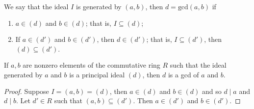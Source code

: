 \begin{definition}
    We say that the ideal \( I \) is generated by \( (a,b) \), then \( d= \text{gcd} (a,b)    \) if      
    \begin{enumerate}
        \item[(i)]  \( a \in (d) \) and \( b \in (d) \); that is, \( I \subseteq (d) \);
        \item[(ii)] If \( a \in (d') \) and \( b \in (d') \), then \( d \in (d') \); that is, \( I \subseteq (d') \), then \( (d) \subseteq (d') \).        
    \end{enumerate}
\end{definition}

\begin{prop}
    If \( a,b  \) are nonzero elements of the commutative ring \( R  \) such that the ideal generated by \( a \) and \( b  \) is a principal ideal \( (d) \), then \( d \) is a gcd of \( a \) and \( b  \).  
\end{prop}

\begin{proof}
Suppose \( I = (a,b) = (d) \), then \( a \in (d) \) and \( b \in (d) \) and so \( d \mid a  \) and \( d \mid b  \). Let \( d' \in R  \) such that \( (a,b) \subseteq (d')\). Then \( a \in (d') \) and \( b \in (d') \).  
  
\end{proof}


